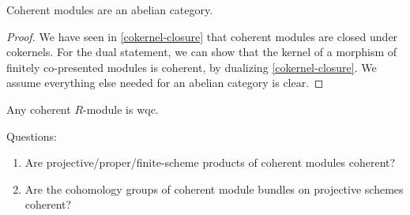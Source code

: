 \begin{theorem}
  Coherent modules are an abelian category.
\end{theorem}

\begin{proof}
  We have seen in \cref{cokernel-closure} that coherent modules are closed under cokernels.
  For the dual statement, we can show that the kernel of a morphism of finitely co-presented modules
  is coherent, by dualizing \cref{cokernel-closure}.
  We assume everything else needed for an abelian category is clear.
\end{proof}

\begin{remark}
  Any coherent $R$-module is wqc.
\end{remark}

Questions:
\begin{enumerate}
\item Are projective/proper/finite-scheme products of coherent modules coherent?
\item Are the cohomology groups of coherent module bundles on projective schemes coherent?
\end{enumerate}
